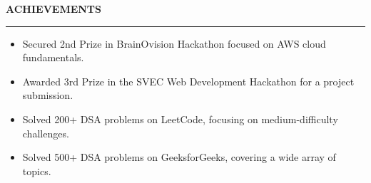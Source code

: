 \documentclass[10pt,a4paper]{article}
\newcommand{\compactspace}{\vspace{5pt}}
\newcommand{\sectiongap}{\vspace{10pt}}
\newcommand{\resumesection}[1]{
    \sectiongap
    {\color{primary} \large \textbf{#1}} \\
    \hrule height 1pt \compactspace
}
\begin{document}
\resumesection{ACHIEVEMENTS}
\begin{itemize}
    \item Secured 2nd Prize in BrainOvision Hackathon focused on AWS cloud fundamentals.
    \item Awarded 3rd Prize in the SVEC Web Development Hackathon for a project submission.
    \item Solved 200+ DSA problems on LeetCode, focusing on medium-difficulty challenges.
    \item Solved 500+ DSA problems on GeeksforGeeks, covering a wide array of topics.
\end{itemize}
\end{document}

